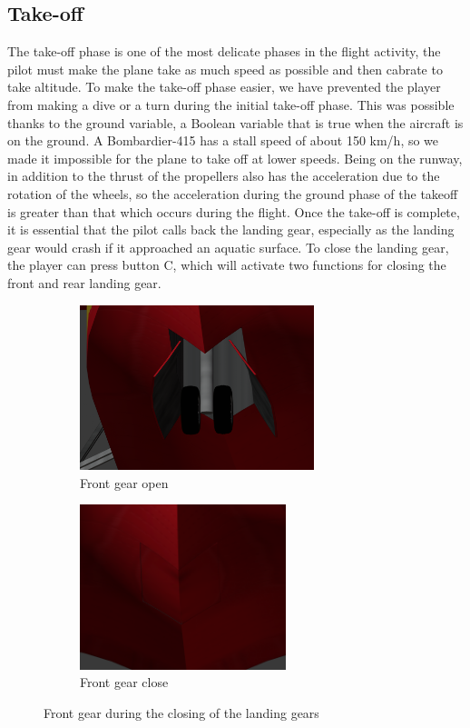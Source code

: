 \documentclass{article}
\begin{document}
\subsection*{Take-off}
The take-off phase is one of the most delicate phases in the flight activity, the pilot must make the plane take as much speed as possible and then cabrate to take altitude. To make the take-off phase easier, we have prevented the player from making a dive or a turn during the initial take-off phase. This was possible thanks to the ground variable, a Boolean variable that is true when the aircraft is on the ground. A Bombardier-415 has a stall speed of about 150 km/h, so we made it impossible for the plane to take off at lower speeds. Being on the runway, in addition to the thrust of the propellers also has the acceleration due to the rotation of the wheels, so the acceleration during the ground phase of the takeoff is greater than that which occurs during the flight. Once the take-off is complete, it is essential that the pilot calls back the landing gear, especially as the landing gear would crash if it approached an aquatic surface. To close the landing gear, the player can press button C, which will activate two functions for closing the front and rear landing gear. 

\begin{figure}[h!]
  \centering
  \begin{subfigure}[b]{0.4\linewidth}
    \includegraphics[height=48mm]{antopen.png}
    \caption{Front gear open}
  \end{subfigure}
  \begin{subfigure}[b]{0.4\linewidth}
    \includegraphics[height=48mm]{antclose.png}
    \caption{Front gear close}
  \end{subfigure}
  \caption{Front gear during the closing of the landing gears}
\end{figure}
\end{document}
